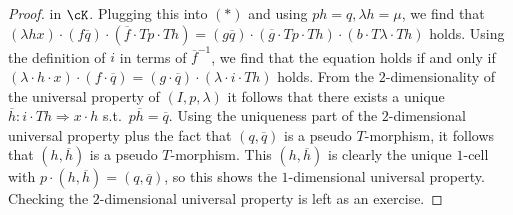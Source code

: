 \documentclass[a4paper,11pt,oneside,openany]{scrbook}
\begin{document}
\begin{proof}
in $\cK$. Plugging this into $(*)$ and using $ph=q, \lambda h=\mu$, we find that $(\lambda hx)\cdot(f\overline{q})\cdot(\overline{f}\cdot Tp\cdot Th)=(g\overline{q})\cdot (\overline{g}\cdot Tp\cdot Th)\cdot (b\cdot T\lambda\cdot Th)$ holds.
Using the definition of $i$ in terms of $\overline{f}^{-1}$, we find that the equation holds if and only if $(\lambda\cdot h\cdot x)\cdot (f\cdot\overline{q})=(g\cdot\overline{q})\cdot(\lambda\cdot i\cdot Th)$ holds. From the $2$-dimensionality of the universal property of $(I,p,\lambda)$ it follows that there exists a unique $\overline{h}\colon i\cdot Th\Rightarrow x\cdot h$ s.t.\ $p\overline{h}=\overline{q}$. Using the uniqueness part of the $2$-dimensional universal property plus the fact that $(q,\overline{q})$ is a pseudo $T$-morphism, it follows that $(h,\overline{h})$ is a pseudo $T$-morphism. This $(h,\overline{h})$ is clearly the unique $1$-cell with $p\cdot (h,\overline{h})=(q,\overline{q})$, so this shows the $1$-dimensional universal property. Checking the $2$-dimensional universal property is left as an exercise.
\end{proof} 

\backmatter
\end{document}
